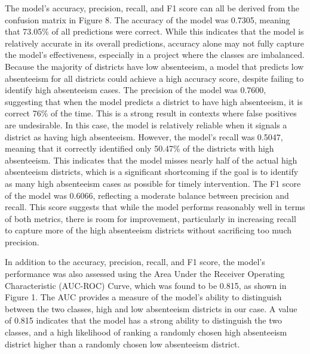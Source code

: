 \documentclass[
  11pt,
]{article}
\begin{document}
The model's accuracy, precision, recall, and F1 score can all be derived
from the confusion matrix in Figure 8. The accuracy of the model was
0.7305, meaning that 73.05\% of all predictions were correct. While this
indicates that the model is relatively accurate in its overall
predictions, accuracy alone may not fully capture the model's
effectiveness, especially in a project where the classes are imbalanced.
Because the majority of districts have low absenteeism, a model that
predicts low absenteeism for all districts could achieve a high accuracy
score, despite failing to identify high absenteeism cases. The precision
of the model was 0.7600, suggesting that when the model predicts a
district to have high absenteeism, it is correct 76\% of the time. This
is a strong result in contexts where false positives are undesirable. In
this case, the model is relatively reliable when it signals a district
as having high absenteeism. However, the model's recall was 0.5047,
meaning that it correctly identified only 50.47\% of the districts with
high absenteeism. This indicates that the model misses nearly half of
the actual high absenteeism districts, which is a significant
shortcoming if the goal is to identify as many high absenteeism cases as
possible for timely intervention. The F1 score of the model was 0.6066,
reflecting a moderate balance between precision and recall. This score
suggests that while the model performs reasonably well in terms of both
metrics, there is room for improvement, particularly in increasing
recall to capture more of the high absenteeism districts without
sacrificing too much precision.

In addition to the accuracy, precision, recall, and F1 score, the
model's performance was also assessed using the Area Under the Receiver
Operating Characteristic (AUC-ROC) Curve, which was found to be 0.815,
as shown in Figure 1. The AUC provides a measure of the model's ability
to distinguish between the two classes, high and low absenteeism
districts in our case. A value of 0.815 indicates that the model has a
strong ability to distinguish the two classes, and a high likelihood of
ranking a randomly chosen high absenteeism district higher than a
randomly chosen low absenteeism district.
\end{document}

